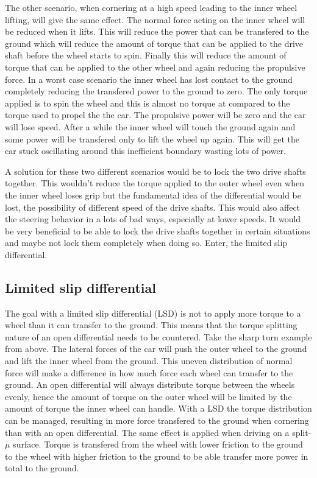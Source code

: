 The other scenario, when cornering at a high speed leading to the inner wheel lifting, will give the same effect. The normal force acting on the inner wheel will be reduced when it lifts. This will reduce the power that can be transfered to the ground which will reduce the amount of torque that can be applied to the drive shaft before the wheel starts to spin. Finally this will reduce the amount of torque that can be applied to the other wheel and again reducing the propulsive force. In a worst case scenario the inner wheel has lost contact to the ground completely reducing the transfered power to the ground to zero. The only torque applied is to spin the wheel and this is almost no torque at compared to the torque used to propel the the car. The propulsive power will be zero and the car will lose speed. After a while the inner wheel will touch the ground again and some power will be transfered only to lift the wheel up again. This will get the car stuck oscillating around this inefficient boundary wasting lots of power.

A solution for these two different scenarios would be to lock the two drive shafts together. This wouldn't reduce the torque applied to the outer wheel even when the inner wheel loses grip but the fundamental idea of the differential would be lost, the possibility of different speed of the drive shafts. This would also affect the steering behavior in a lots of bad ways, especially at lower speeds. It would be very beneficial to be able to lock the drive shafts together in certain situations and maybe not lock them completely when doing so. Enter, the limited slip differential.

\subsection{Limited slip differential}
The goal with a limited slip differential (LSD) is not to apply more torque to a wheel than it can transfer to the ground. This means that the torque splitting nature of an open differential needs to be countered. Take the sharp turn example from above. The lateral forces of the car will push the outer wheel to the ground and lift the inner wheel from the ground. This uneven distribution of normal force will make a difference in how much force each wheel can transfer to the ground. An open differential will always distribute torque between the wheels evenly, hence the amount of torque on the outer wheel will be limited by the amount of torque the inner wheel can handle. With a LSD the torque distribution can be managed, resulting in more force transfered to the ground when cornering than with an open differential. The same effect is applied when driving on a split-$ \mu $ surface. Torque is transfered from the wheel with lower friction to the ground to the wheel with higher friction to the ground to be able transfer more power in total to the ground.

